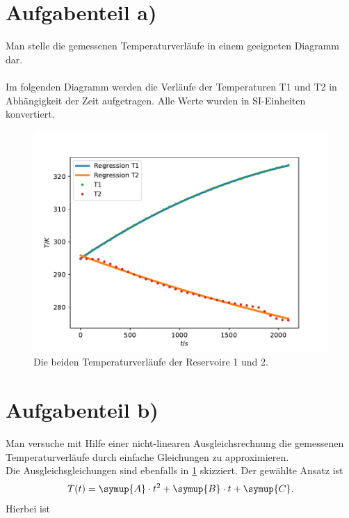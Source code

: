 \documentclass{scrartcl} %
\begin{document}
\section{Aufgabenteil a)}
  Man stelle die gemessenen Temperaturverläufe in einem geeigneten Diagramm dar. \\
  \\
  Im folgenden Diagramm werden die Verläufe der Temperaturen T1 und T2 in Abhängigkeit der Zeit aufgetragen.
  Alle Werte wurden in SI-Einheiten konvertiert.
  \\
  \begin{figure}
    \centering
    \includegraphics[scale = 0.75]{Temperaturverlaeufe.pdf}
    \caption{Die beiden Temperaturverläufe der Reservoire 1 und 2.}
    \label{fig:TemperaturverlaufA}
  \end{figure}
\section{Aufgabenteil b)}
  Man versuche mit Hilfe einer nicht-linearen Ausgleichsrechnung die gemessenen Temperaturverläufe durch einfache Gleichungen zu approximieren.
  \\
  Die Ausgleichsgleichungen sind ebenfalls in \ref{fig:TemperaturverlaufA} skizziert. Der gewählte Ansatz ist
  \begin{equation}
    T(t) = \symup{A} \cdot t^2 + \symup{B} \cdot t + \symup{C}.
    \label{eq:Regressionsgleichung}
  \end{equation}
  Hierbei ist
\end{document}
